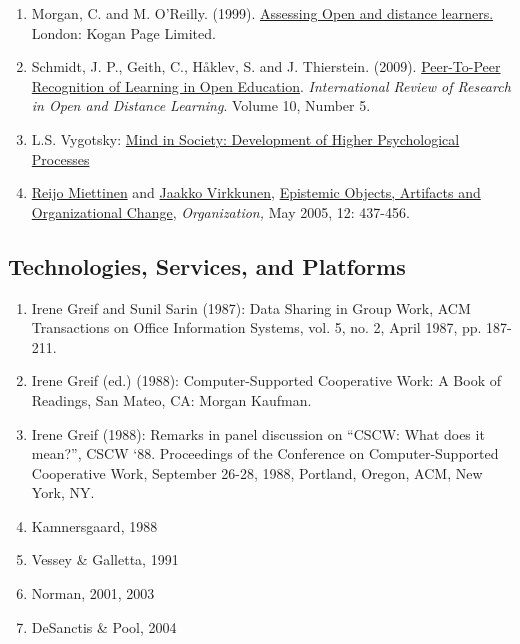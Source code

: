 \begin{enumerate}
\item
  Morgan, C. and M. O'Reilly. (1999).
  \href{http://www.amazon.com/Assessing-Distance-Learners-Flexible-Learning/dp/0749428783/ref=tmm\_pap\_title\_0?ie=UTF8\&qid=1388199564\&sr=1-1}{Assessing
  Open and distance learners.} London: Kogan Page Limited.
\item
  Schmidt, J. P., Geith, C., Håklev, S. and J. Thierstein. (2009).
  \href{http://www.irrodl.org/index.php/irrodl/article/view/641/1389}{Peer-To-Peer
  Recognition of Learning in Open Education}. \emph{International Review
  of Research in Open and Distance Learning}. Volume 10, Number 5.
\item
  L.S. Vygotsky:
  \href{http://books.google.com/books?id=RxjjUefze\_oC\&printsec=frontcover\&source=gbs\_atb\#v=onepage\&q\&f=false}{Mind
  in Society: Development of Higher Psychological Processes}
\item
  \href{http://org.sagepub.com/search?author1=Reijo+Miettinen\&sortspec=date\&submit=Submit}{Reijo
  Miettinen} and
  \href{http://org.sagepub.com/search?author1=Jaakko+Virkkunen\&sortspec=date\&submit=Submit}{Jaakko
  Virkkunen},
  \href{http://org.sagepub.com/content/12/3/437.abstract}{Epistemic
  Objects, Artifacts and Organizational Change}, \emph{Organization,}
  May 2005, 12: 437-456.
\end{enumerate}
\subsection{Technologies, Services, and Platforms}

\begin{enumerate}
\item
  Irene Greif and Sunil Sarin (1987): Data Sharing in Group Work, ACM
  Transactions on Office Information Systems, vol. 5, no. 2, April 1987,
  pp. 187-211.
\item
  Irene Greif (ed.) (1988): Computer-Supported Cooperative Work: A Book
  of Readings, San Mateo, CA: Morgan Kaufman.
\item
  Irene Greif (1988): Remarks in panel discussion on ``CSCW: What does
  it mean?'', CSCW `88. Proceedings of the Conference on
  Computer-Supported Cooperative Work, September 26-28, 1988, Portland,
  Oregon, ACM, New York, NY.
\item
  Kamnersgaard, 1988
\item
  Vessey \& Galletta, 1991
\item
  Norman, 2001, 2003
\item
  DeSanctis \& Pool, 2004
\end{enumerate}

